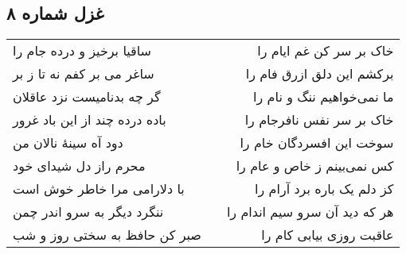 \begin{center}
\section*{غزل شماره ۸}
\label{sec:sh008}
\begin{longtable}{l p{0.5cm} r}
ساقیا برخیز و درده جام را
&&
خاک بر سر کن غم ایام را
\\
ساغر می بر کفم نه تا ز بر
&&
برکشم این دلق ازرق فام را
\\
گر چه بدنامیست نزد عاقلان
&&
ما نمی‌خواهیم ننگ و نام را
\\
باده درده چند از این باد غرور
&&
خاک بر سر نفس نافرجام را
\\
دود آه سینهٔ نالان من
&&
سوخت این افسردگان خام را
\\
محرم راز دل شیدای خود
&&
کس نمی‌بینم ز خاص و عام را
\\
با دلارامی مرا خاطر خوش است
&&
کز دلم یک باره برد آرام را
\\
ننگرد دیگر به سرو اندر چمن
&&
هر که دید آن سرو سیم اندام را
\\
صبر کن حافظ به سختی روز و شب
&&
عاقبت روزی بیابی کام را
\\
\end{longtable}
\end{center}
